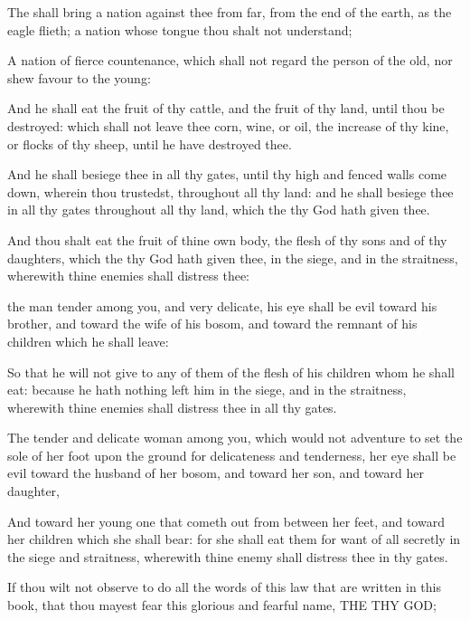 {The
{} shall
bring a
nation against thee from
far, from the
end of the
earth,
{} as the
eagle
flieth; a
nation whose
tongue thou shalt not
understand;

A
nation of
fierce
countenance, which shall not
regard the
person of the
old, nor shew
favour to the
young:

And he shall
eat the
fruit of thy
cattle, and the
fruit of thy
land, until thou be
destroyed: which
{} shall not
leave thee
{}
corn,
wine, or
oil,
{} the
increase of thy
kine, or
flocks of thy
sheep, until he have
destroyed thee.

And he shall
besiege thee in all thy
gates, until thy
high and
fenced
walls come
down,
wherein thou
trustedst, throughout all thy
land: and he shall
besiege thee in all thy
gates throughout all thy
land, which the
{} thy
God hath
given thee.

And thou shalt
eat the
fruit of thine own
body, the
flesh of thy
sons and of thy
daughters, which the
{} thy
God hath
given thee, in the
siege, and in the
straitness, wherewith thine
enemies shall
distress thee:

 the
man
{}
tender among you, and
very
delicate, his
eye shall be
evil toward his
brother, and toward the
wife of his
bosom, and toward the
remnant of his
children which he shall
leave:

So that he will not
give to
any of them of the
flesh of his
children whom he shall
eat: because he hath nothing
left him in the
siege, and in the
straitness, wherewith thine
enemies shall
distress thee in all thy
gates.

The
tender and
delicate woman among you, which would not
adventure to
set the
sole of her
foot upon the
ground for
delicateness and
tenderness, her
eye shall be
evil toward the
husband of her
bosom, and toward her
son, and toward her
daughter,

And toward her young
one that cometh
out from between her
feet, and toward her
children which she shall
bear: for she shall
eat them for
want of all
{}
secretly in the
siege and
straitness, wherewith thine
enemy shall
distress thee in thy
gates.

If thou wilt not
observe to
do all the
words of this
law that are
written in this
book, that thou mayest
fear this
glorious and
fearful
name, THE
{} THY
GOD;

}
